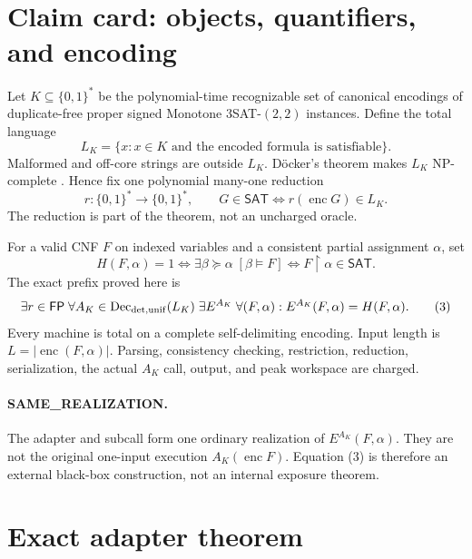 \documentclass[11pt]{article}
\newcommand{\SAT}{\mathsf{SAT}}
\begin{document}
\section{Claim card: objects, quantifiers, and encoding}

Let \(K\subseteq\{0,1\}^*\) be the polynomial-time recognizable set of
canonical encodings of duplicate-free proper signed Monotone
\(3\)SAT-\((2,2)\) instances.  Define the total language
\[
 L_K=\{x:x\in K\text{ and the encoded formula is satisfiable}\}.
\]
Malformed and off-core strings are outside \(L_K\).  D\"ocker's theorem makes
\(L_K\) NP-complete \cite{Docker}.  Hence fix one polynomial many-one
reduction
\[
 r:\{0,1\}^*\longrightarrow\{0,1\}^*,
 \qquad
 G\in\SAT\Longleftrightarrow r(\operatorname{enc}G)\in L_K.       \tag{1}
\]
The reduction is part of the theorem, not an uncharged oracle.

For a valid CNF \(F\) on indexed variables and a consistent partial
assignment \(\alpha\), set
\[
 H(F,\alpha)=1
 \Longleftrightarrow
 \exists\beta\succeq\alpha\;[\beta\models F]
 \Longleftrightarrow
 F\upharpoonright\alpha\in\SAT.                                  \tag{2}
\]
The exact prefix proved here is
\[
 \exists r\in\mathsf{FP}\;
 \forall A_K\in\operatorname{Dec}_{\rm det,unif}(L_K)\;
 \exists E^{A_K}\;
 \forall(F,\alpha):
 E^{A_K}(F,\alpha)=H(F,\alpha).                                  \tag{3}
\]
Every machine is total on a complete self-delimiting encoding.  Input length
is \(L=|\operatorname{enc}(F,\alpha)|\).  Parsing, consistency checking,
restriction, reduction, serialization, the actual \(A_K\) call, output, and
peak workspace are charged.

\paragraph{SAME\_REALIZATION.}
The adapter and subcall form one ordinary realization of
\(E^{A_K}(F,\alpha)\).  They are not the original one-input execution
\(A_K(\operatorname{enc}F)\).  Equation (3) is therefore an external
black-box construction, not an internal exposure theorem.

\section{Exact adapter theorem}
\end{document}
